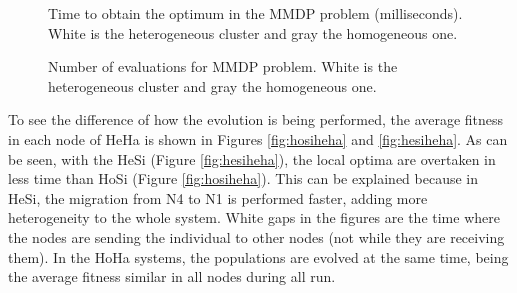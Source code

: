 




\begin{figure}
\centering
{}
\caption{Time to obtain the optimum in the MMDP problem (milliseconds). White is the heterogeneous cluster and gray the homogeneous one.}
\label{fig:timeMMDP}
\end{figure}

\begin{figure}
\centering
{}
\caption{Number of evaluations for MMDP problem. White is the heterogeneous cluster and gray the homogeneous one.}
\label{fig:evalsMMDP}
\end{figure}

To see the difference of how the evolution is being performed, the average fitness in each node of HeHa is shown in Figures \ref{fig:hosiheha} and \ref{fig:hesiheha}. As can be seen, with the HeSi (Figure \ref{fig:hesiheha}), the local optima are overtaken in less time than HoSi (Figure \ref{fig:hosiheha}).  This can be explained because in HeSi, the migration from N4 to N1 is performed faster, adding more heterogeneity to the whole system. White gaps in the figures are the time where the nodes are sending the individual to other nodes (not while they are receiving them). In the HoHa systems, the populations are evolved at the same time, being the average fitness similar in all nodes during all run. %


\begin{figure*}
\centering
{}
\caption{Average fitness in the first 1000 milliseconds of execution of the four nodes of the heterogeneous cluster with the same population sizes (HoSi/HeHa) for the MMDP problem.}
\label{fig:hosiheha}
\end{figure*}

